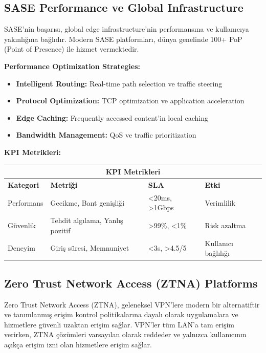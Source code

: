 \subsection{SASE Performance ve Global Infrastructure}

SASE'nin başarısı, global edge infrastructure'nin performansına ve kullanıcıya yakınlığına bağlıdır. Modern SASE platformları, dünya genelinde 100+ PoP (Point of Presence) ile hizmet vermektedir.

\textbf{Performance Optimization Strategies:}
\begin{itemize}
    \item \textbf{Intelligent Routing:} Real-time path selection ve traffic steering
    \item \textbf{Protocol Optimization:} TCP optimization ve application acceleration
    \item \textbf{Edge Caching:} Frequently accessed content'in local caching
    \item \textbf{Bandwidth Management:} QoS ve traffic prioritization
\end{itemize}

\noindent\textbf{KPI Metrikleri:}

\begin{adjustbox}{max width=\textwidth}
\small
\begin{tabularx}{\textwidth}{|p{2.5cm}|p{3cm}|p{2cm}|p{2cm}|}
\hline
\multicolumn{4}{|c|}{\textbf{KPI Metrikleri}} \\
\hline
\textbf{Kategori} & \textbf{Metriği} & \textbf{SLA} & \textbf{Etki} \\
\hline
Performans & Gecikme, Bant genişliği & <20ms, >1Gbps & Verimlilik \\
\hline
Güvenlik & Tehdit algılama, Yanlış pozitif & >99\%, <1\% & Risk azaltma \\
\hline
Deneyim & Giriş süresi, Memnuniyet & <3s, >4.5/5 & Kullanıcı bağlılığı \\
\hline
\end{tabularx}
\end{adjustbox}


\subsection{Zero Trust Network Access (ZTNA) Platforms}

Zero Trust Network Access (ZTNA), geleneksel VPN'lere modern bir alternatiftir ve tanımlanmış erişim kontrol politikalarına dayalı olarak uygulamalara ve hizmetlere güvenli uzaktan erişim sağlar. VPN'ler tüm LAN'a tam erişim verirken, ZTNA çözümleri varsayılan olarak reddeder ve yalnızca kullanıcının açıkça erişim izni olan hizmetlere erişim sağlar.

